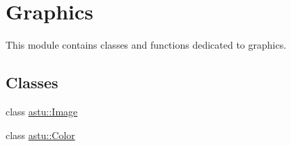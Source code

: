 \hypertarget{group__gfx__group}{}\section{Graphics}
\label{group__gfx__group}


This module contains classes and functions dedicated to graphics.  


\subsection*{Classes}
\begin{DoxyCompactItemize}
\item 
class \hyperlink{classastu_1_1Image}{astu\+::\+Image}
\item 
class \hyperlink{classastu_1_1Color}{astu\+::\+Color}
\end{DoxyCompactItemize}
